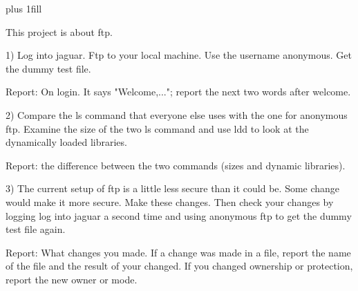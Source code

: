 
\rightskip=0pt plus 1fill

\parindent 0pt

This project is about ftp.

1) Log into jaguar.
Ftp to your local machine.
Use the username anonymous.
Get the dummy test file.

Report: On login. It says "Welcome,...";
report the next two words after welcome.

2) Compare the {\ltt{}ls} command that everyone else uses with the
one for anonymous ftp.
Examine the size of the two ls command
and use {\ltt{}ldd} to look at the dynamically loaded libraries.

Report: the difference between the two commands (sizes and dynamic libraries).

3) The current setup of ftp is a little less secure than it
could be.
Some change would make it more secure.
Make these changes.
Then check your changes by logging log into jaguar a second time
and using anonymous ftp to get the dummy test file again.

Report: What changes you made.
If a change was made in a file, report the name of the file and
the result of your changed.
If you changed ownership or protection, report the new owner or mode.
\bye
